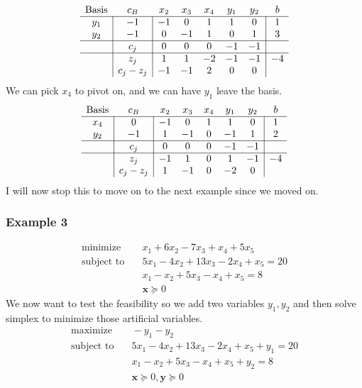 \documentclass[11pt]{article}
\begin{document}
\[
\begin{array}{c|c|ccccc|c}
\text{Basis} & c_B & x_2 & x_3 & x_4 & y_1 & y_2 & b \\ \hline
y_1 & -1 & -1 & 0 & 1 & 1 & 0 & 1 \\
y_2 & -1 & 0 & -1 & 1 & 0 & 1 & 3 \\ \hline
 & c_j & 0 & 0 & 0 & -1 & -1 & \\ \hline
 & z_j & 1 & 1 & -2 & -1 & -1 & -4 \\
 & c_j-z_j & -1 & -1 & 2 & 0 & 0 &
\end{array}
\]
We can pick $x_4$ to pivot on, and we can have $y_1$ leave the basis.
\[
\begin{array}{c|c|ccccc|c}
\text{Basis} & c_B & x_2 & x_3 & x_4 & y_1 & y_2 & b \\ \hline
x_4 & 0 & -1 & 0 & 1 & 1 & 0 & 1 \\
y_2 & -1 & 1 & -1 & 0 & -1 & 1 & 2 \\ \hline
 & c_j & 0 & 0 & 0 & -1 & -1 & \\ \hline
 & z_j & -1 & 1 & 0 & 1 & -1 & -4 \\
 & c_j-z_j & 1 & -1 & 0 & -2 & 0 &
\end{array}
\]
I will now stop this to move on to the next example since we moved on.

\subsubsection{Example 3}
\begin{align}
  \text{minimize} & \quad x_1 + 6x_2 - 7x_3 + x_4 + 5x_5 \\
  \text{subject to} & \quad 5x_1 - 4x_2 + 13x_3 - 2x_4 + x_5 = 20 \\
  & \quad x_1 - x_2 + 5x_3 - x_4 + x_5 = 8 \\
  & \quad \textbf{x} \succeq 0 
\end{align}
We now want to test the feasibility so we add two variables $y_1, y_2$ and then solve simplex to minimize those artificial variables.
\begin{align}
  \text{maximize} & \quad -y_1 - y_2 \\
  \text{subject to} & \quad 5x_1 - 4x_2 + 13x_3 - 2x_4 + x_5 + y_1 = 20 \\
  & \quad x_1 - x_2 + 5x_3 - x_4 + x_5 + y_2 = 8 \\
  & \quad \textbf{x} \succeq 0, \textbf{y} \succeq 0
\end{align}
\end{document}
